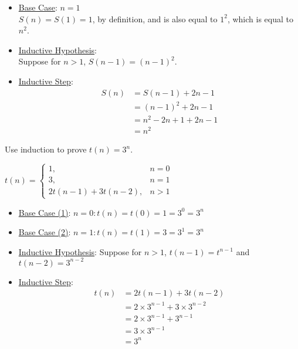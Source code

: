 \documentclass{article}
\begin{document}
        \begin{itemize}
            \item \underline{Base Case}: $n = 1$ \\
            $S(n) = S(1) = 1$, by definition, and is also equal to $1^2$, which is equal to $n^2$.
            \item \underline{Inductive Hypothesis}: \\
            Suppose for $n > 1$, $S(n-1) = (n-1)^2$.
            \item \underline{Inductive Step}:
            \begin{align*}
                S(n) &= S(n-1) + 2n - 1 \\
                &= (n-1)^2 + 2n -1\\
                &= n^2 - 2n + 1 + 2n - 1 \\
                &= n^2
            \end{align*}
        \end{itemize}

\newpage

        Use induction to prove $t(n) = 3^n$.

        \begin{center}
            
        $t(n) =
        \begin{cases}
            1, & n = 0 \\
            3, & n = 1 \\
            2t(n - 1) + 3t(n-2), & n > 1
        \end{cases} $

        \end{center}

        \begin{itemize}
            \item \underline{Base Case (1)}: $n = 0: t(n) = t(0) = 1 = 3^0 = 3^n$
            \item \underline{Base Case (2)}: $n = 1: t(n) = t(1) = 3 = 3^1 = 3^n$
            \item \underline{Inductive Hypothesis}: Suppose for $n > 1$, $t(n-1) = t^{n-1}$ and $t(n-2) = 3^{n - 2}$
            \item \underline{Inductive Step}:
            \begin{align*}
                t(n) &= 2t(n-1) + 3t(n-2) \\
                &= 2\times3^{n-1} + 3\times3^{n-2} \\
                &= 2\times3^{n-1} + 3^{n-1}\\
                &= 3\times3^{n-1} \\
                &= 3^n
            \end{align*}
        \end{itemize}
\end{document}
